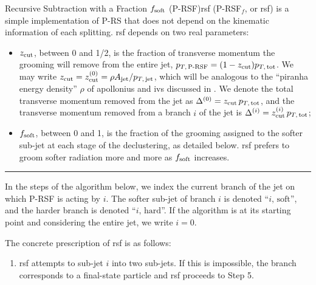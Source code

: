 \begin{definitionbox}{Recursive Subtraction with a Fraction \(f_{\rm soft}\) (P-RSF)}{rsf}
     (P-RSF\(_f\), or \gls{rsf}) is a simple implementation of P-RS that does not depend on the kinematic information of each splitting.
    \gls{rsf} depends on two real parameters:
    \begin{itemize}
        \item
        \(z_{\rm cut}\), between 0 and 1/2, is the fraction of transverse momentum the grooming will remove from the entire jet, \(p_{T,\,\text{P-RSF}} = (1 - z_{\rm cut}) p_{T,\,\rm tot}\).
        We may write \(z_{\rm cut} = z_{\rm cut}^{(0)} = \rho A_{\rm jet} / p_{T,\,\rm jet}\), which will be analogous to the ``piranha energy density'' \(\rho\) of \gls{apollonius} and \gls{ivs} discussed in .
        We denote the total transverse momentum removed from the jet as \(\Delta^{(0)} = z_{\rm cut}\,p_{T,\,\rm tot}\), and the transverse momentum removed from a branch \(i\) of the jet is \(\Delta^{(i)} = z_{\rm cut}^{(i)}\,p_{T,\,\rm tot}\);

        \item
        \(f_{\rm soft}\), between 0 and 1, is the fraction of the grooming assigned to the softer sub-jet at each stage of the \gls{declustering}, as detailed below.
        \gls{rsf} prefers to groom softer radiation more and more as \(f_{\rm soft}\) increases.
    \end{itemize}


    \vspace{7pt}
    \hrule
    \vspace{7pt}

    In the steps of the algorithm below, we index the current branch of the jet on which P-RSF is acting by \(i\).
    The softer sub-jet of branch \(i\) is denoted ``\(i,\,\text{soft}\)'', and the harder branch is denoted ``\(i,\,\text{hard}\)''.
    If the algorithm is at its starting point and considering the entire jet, we write \(i = 0\).

    The concrete prescription of \gls{rsf} is as follows:
    \begin{enumerate}
        \item
        \gls{rsf} attempts to  sub-jet \(i\) into two sub-jets.
        If this is impossible, the branch corresponds to a final-state particle and \gls{rsf} proceeds to Step 5.
        \label{item:rsf_initial}


\end{enumerate}
\end{definitionbox}
